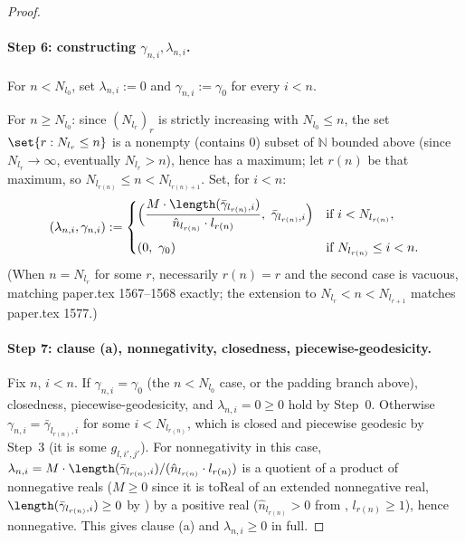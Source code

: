 \begin{proof}
  \paragraph{Step 6: constructing $\gamma_{n,i},\lambda_{n,i}$.} For $n<N_{l_0}$, set
  $\lambda_{n,i}:=0$ and $\gamma_{n,i}:=\gamma_0$ for every $i<n$.

  For $n\ge N_{l_0}$: since $(N_{l_r})_r$ is strictly increasing with $N_{l_0}\le n$, the set
  $\set{r : N_{l_r}\le n}$ is a nonempty (contains $0$) subset of $\mathbb N$ bounded above (since
  $N_{l_r}\to\infty$, eventually $N_{l_r}>n$), hence has a maximum; let $r(n)$ be that maximum, so
  $N_{l_{r(n)}}\le n<N_{l_{r(n)+1}}$. Set, for $i<n$:
  \[
    (\lambda_{n,i},\gamma_{n,i}) :=
    \begin{cases}
      \Bigl(\dfrac{M\cdot\length(\bar\gamma_{l_{r(n)},i})}{\hat n_{l_{r(n)}}\cdot l_{r(n)}},\
        \bar\gamma_{l_{r(n)},i}\Bigr) & \text{if } i<N_{l_{r(n)}} , \\[1.2em]
      (0,\ \gamma_0) & \text{if } N_{l_{r(n)}}\le i<n .
    \end{cases}
  \]
  (When $n=N_{l_r}$ for some $r$, necessarily $r(n)=r$ and the second case is vacuous, matching
  paper.tex 1567--1568 exactly; the extension to $N_{l_r}<n<N_{l_{r+1}}$ matches paper.tex 1577.)

  \paragraph{Step 7: clause (a), nonnegativity, closedness, piecewise-geodesicity.} Fix $n$,
  $i<n$. If $\gamma_{n,i}=\gamma_0$ (the $n<N_{l_0}$ case, or the padding branch above), closedness,
  piecewise-geodesicity, and $\lambda_{n,i}=0\ge0$ hold by Step~0. Otherwise
  $\gamma_{n,i}=\bar\gamma_{l_{r(n)},i}$ for some $i<N_{l_{r(n)}}$, which is closed and piecewise
  geodesic by Step~3 (it is some $g_{l,i',j'}$). For nonnegativity in this case,
  $\lambda_{n,i}=M\cdot\length(\bar\gamma_{l_{r(n)},i})/(\hat n_{l_{r(n)}}\cdot l_{r(n)})$ is a
  quotient of a product of nonnegative reals ($M\ge0$ since it is $\mathrm{toReal}$ of an extended
  nonnegative real, $\length(\bar\gamma_{l_{r(n)},i})\ge0$ by \noderef{Curve}) by a positive real
  ($\hat n_{l_{r(n)}}>0$ from \noderef{BBAssertion}, $l_{r(n)}\ge1$), hence nonnegative. This gives
  clause (a) and $\lambda_{n,i}\ge0$ in full.


\end{proof}
